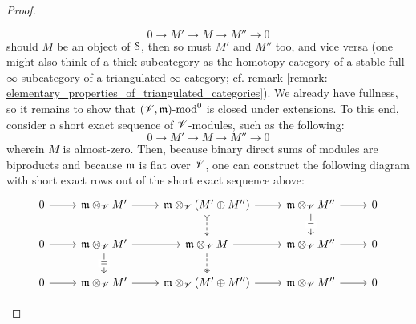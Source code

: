 \begin{proof}
\begin{enumerate}
                                    $$0 \to M' \to M \to M'' \to 0$$
                                should $M$ be an object of $\S$, then so must $M'$ and $M''$ too, and vice versa (one might also think of a thick subcategory as the homotopy category of a stable full $\infty$-subcategory of a triangulated $\infty$-category; cf. remark \ref{remark: elementary_properties_of_triangulated_categories}). We already have fullness, so it remains to show that $(\scrV, \m)\mod^0$ is closed under extensions. To this end, consider a short exact sequence of $\scrV$-modules, such as the following:
                                    $$0 \to M' \to M \to M'' \to 0$$
                                wherein $M$ is almost-zero. Then, because binary direct sums of modules are biproducts and because $\m$ is flat over $\scrV$, one can construct the following diagram with short exact rows out of the short exact sequence above:
                                    $$
                                        \begin{tikzcd}
                                        	0 & {\m \tensor_{\scrV} M'} & {\m \tensor_{\scrV} (M' \oplus M'')} & {\m \tensor_{\scrV} M''} & 0 \\
                                        	0 & {\m \tensor_{\scrV} M'} & {\m \tensor_{\scrV} M} & {\m \tensor_{\scrV} M''} & 0 \\
                                        	0 & {\m \tensor_{\scrV} M'} & {\m \tensor_{\scrV} (M' \oplus M'')} & {\m \tensor_{\scrV} M''} & 0
                                        	\arrow[from=1-1, to=1-2]
                                        	\arrow[from=1-2, to=1-3]
                                        	\arrow[from=1-3, to=1-4]
                                        	\arrow[from=1-4, to=1-5]
                                        	\arrow[from=2-1, to=2-2]
                                        	\arrow[from=2-2, to=2-3]
                                        	\arrow[from=2-3, to=2-4]
                                        	\arrow[from=2-4, to=2-5]
                                        	\arrow[from=3-1, to=3-2]
                                        	\arrow[from=3-2, to=3-3]
                                        	\arrow[from=3-3, to=3-4]
                                        	\arrow[from=3-4, to=3-5]
                                        	\arrow["{=}"{description}, from=2-2, to=3-2]
                                        	\arrow[dashed, tail, from=1-3, to=2-3]
                                        	\arrow[dashed, two heads, from=2-3, to=3-3]
                                        	\arrow["{=}"{description}, from=1-4, to=2-4]

\end{tikzcd}$$
\end{enumerate}
\end{proof}
